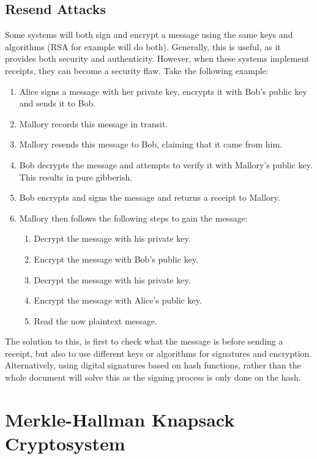 		\subsection{Resend Attacks}
			Some systems will both sign and encrypt a message using the same keys and algorithms (RSA for example will do both). 
			Generally, this is useful, as it provides both security and authenticity. 
			However, when these systems implement receipts, they can become a security flaw. 
			Take the following example:
			\begin{enumerate}
				\item Alice signs a message with her private key, encrypts it with Bob's public key and sends it to Bob. 
				\item Mallory records this message in transit. 
				\item Mallory resends this message to Bob, claiming that it came from him. 
				\item Bob decrypts the message and attempts to verify it with Mallory's public key. 
					This results in pure gibberish. 
				\item Bob encrypts and signs the message and returns a receipt to Mallory. 
				\item Mallory then follows the following steps to gain the message:
					\begin{enumerate}
						\item Decrypt the message with his private key. 
						\item Encrypt the message with Bob's public key. 
						\item Decrypt the message with his private key. 
						\item Encrypt the message with Alice's public key. 
						\item Read the now plaintext message. 
					\end{enumerate}
			\end{enumerate}

			The solution to this, is first to check what the message is before sending a receipt, but also to use different keys or algorithms for signatures and encryption. 
			Alternatively, using digital signatures based on hash functions, rather than the whole document will solve this as the signing process is only done on the hash. 

	\section{Merkle-Hallman Knapsack Cryptosystem}
